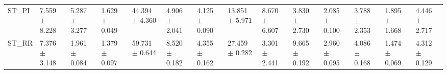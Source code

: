 \begin{tabular}{llllllllllllll}
ST_PI     &   7.559 $ \pm $ 8.228 &  5.287 $ \pm $ 3.277 &  1.629 $ \pm $ 0.049 &   44.394 $ \pm $ 4.360 &   4.906 $ \pm $ 2.041 &   4.125 $ \pm $ 0.090 &  13.851 $ \pm $ 5.971 &   8.670 $ \pm $ 6.607 &   3.830 $ \pm $ 2.730 &  2.085 $ \pm $ 0.100 &   3.788 $ \pm $ 2.353 &  1.895 $ \pm $ 1.668 &   4.446 $ \pm $ 2.717 \\
ST_RR     &   7.376 $ \pm $ 3.148 &  1.961 $ \pm $ 0.084 &  1.379 $ \pm $ 0.097 &   59.731 $ \pm $ 0.644 &   8.520 $ \pm $ 0.182 &   4.355 $ \pm $ 0.162 &  27.459 $ \pm $ 0.282 &   3.301 $ \pm $ 2.441 &   9.665 $ \pm $ 0.192 &  2.960 $ \pm $ 0.095 &   4.086 $ \pm $ 0.168 &  1.474 $ \pm $ 0.069 &   4.312 $ \pm $ 0.129 \\
\bottomrule
\end{tabular}
